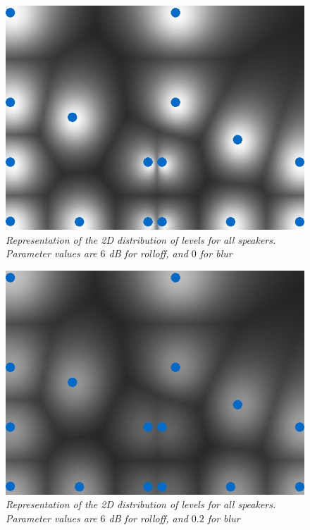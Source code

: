 \documentclass[twoside,10pt]{article}
\begin{document}
\begin{figure}[ht]
\centerline{\includegraphics[scale=0.5]{all_r_6_b_0}}
\caption{{\it Representation of the 2D distribution of levels for all speakers. Parameter values are $6$ dB for rolloff, and $0$ for blur}}  
\label{fig:allspk2}
\end{figure}

\begin{figure}[ht]
\centerline{\includegraphics[scale=0.5]{all_r_6_b_0_2}}
\caption{{\it Representation of the 2D distribution of levels for all speakers. Parameter values are $6$ dB for rolloff, and $0.2$ for blur}}  
\label{fig:allspk3}
\end{figure}
\end{document}
